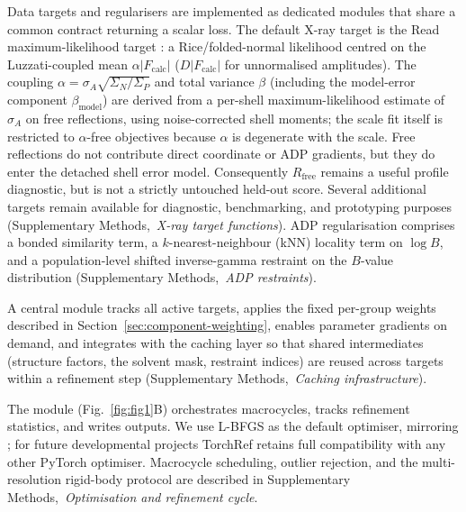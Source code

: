 \documentclass{iucrjournals}
\newcommand{\suppref}[1]{Supplementary Methods,~\emph{#1}}
\newcommand{\suppparen}[1]{(\suppref{#1})}
\begin{document}
Data targets and regularisers are implemented as dedicated modules that
share a common  contract returning a scalar loss.
The default X-ray target is the Read maximum-likelihood  target
\cite{read_improved_1986}: a Rice/folded-normal
likelihood centred on the Luzzati-coupled mean
$\alpha |F_\mathrm{calc}|$ ($D|F_\mathrm{calc}|$ for unnormalised amplitudes).
The coupling
$\alpha = \sigma_A\sqrt{\Sigma_N/\Sigma_P}$ and total variance $\beta$
(including the model-error component $\beta_\mathrm{model}$)
are derived from a per-shell maximum-likelihood estimate of $\sigma_A$ on free
reflections, using noise-corrected shell moments; the scale fit itself is restricted to
$\alpha$-free objectives because $\alpha$ is degenerate with the scale.
Free reflections do not contribute direct coordinate or ADP gradients, but they
do enter the detached shell error model. Consequently $R_\mathrm{free}$ remains
a useful profile diagnostic, but is not a strictly untouched held-out score.
Several additional targets remain available for diagnostic, benchmarking, and
prototyping purposes (\suppref{X-ray target functions}).
ADP regularisation comprises a bonded similarity term, a $k$-nearest-neighbour
(kNN) locality term on $\log B$, and a population-level shifted inverse-gamma
restraint on the $B$-value distribution \suppparen{ADP restraints}.

A central  module tracks all active targets, applies the
fixed per-group weights described in Section~\ref{sec:component-weighting},
enables parameter gradients on demand, and integrates with the caching
layer so that shared intermediates (structure factors, the solvent mask,
restraint indices) are reused across targets within a refinement step
\suppparen{Caching infrastructure}.

The  module (Fig.\ \ref{fig:fig1}B) orchestrates
macrocycles, tracks refinement statistics, and writes outputs.
We use L-BFGS as the default optimiser, mirroring 
\cite{afonine_towards_2012}; for future developmental projects TorchRef retains full compatibility with any other PyTorch optimiser.
Macrocycle scheduling, outlier rejection, and the multi-resolution
rigid-body protocol are described in
\suppref{Optimisation and refinement cycle}.
\end{document}
